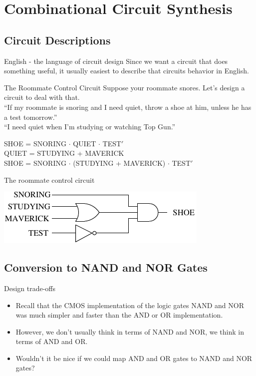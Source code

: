 \section{Combinational Circuit Synthesis}

\subsection{Circuit Descriptions}

\begin{frame}{English - the language of circuit design}
  Since we want a circuit that does something useful, it usually easiest to describe that circuits behavior in English.
  \begin{block}{The Roommate Control Circuit}
    Suppose your roommate snores.  Let's design a circuit to deal with that.\\
    ``If my roommate is snoring and I need quiet, throw a shoe at him, unless he has a test tomorrow.''\\
    ``I need quiet when I'm studying or watching Top Gun.''
  \end{block}
  SHOE = SNORING $\cdot$ QUIET $\cdot$ TEST$'$ \\
  QUIET = STUDYING + MAVERICK \\
  SHOE = SNORING $\cdot$ (STUDYING + MAVERICK) $\cdot$ TEST$'$ 
\end{frame}

\begin{frame}{The roommate control circuit}
  \begin{center}
    \includegraphics[scale=1.5]{RoommateControlCircuit}
  \end{center}
\end{frame}

\subsection{Conversion to NAND and NOR Gates}

\begin{frame}{Design trade-offs}
  \begin{itemize}
    \item Recall that the CMOS implementation of the logic gates NAND and NOR was much simpler and faster than the AND or OR implementation.
    \item However, we don't usually think in terms of NAND and NOR, we think in terms of AND and OR.
    \item Wouldn't it be nice if we could map AND and OR gates to NAND and NOR gates?
  \end{itemize}
\end{frame}

